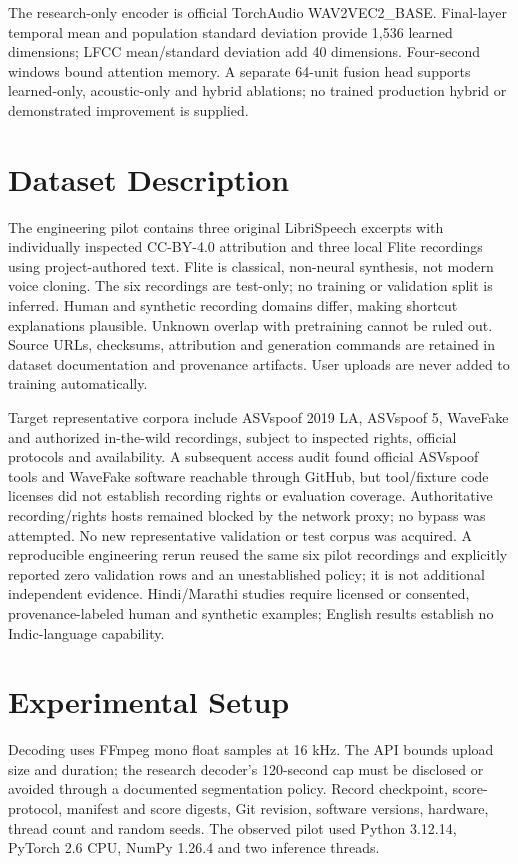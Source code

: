\IfFileExists{IEEEtran.cls}{\documentclass[conference]{IEEEtran}}{\documentclass[10pt,twocolumn]{article}\usepackage[margin=0.75in]{geometry}}
\begin{document}
The research-only encoder is official TorchAudio WAV2VEC2\_BASE. Final-layer temporal mean and population standard deviation provide 1,536 learned dimensions; LFCC mean/standard deviation add 40 dimensions. Four-second windows bound attention memory. A separate 64-unit fusion head supports learned-only, acoustic-only and hybrid ablations; no trained production hybrid or demonstrated improvement is supplied.

\section{Dataset Description}
The engineering pilot contains three original LibriSpeech excerpts with individually inspected CC-BY-4.0 attribution and three local Flite recordings using project-authored text. Flite is classical, non-neural synthesis, not modern voice cloning. The six recordings are test-only; no training or validation split is inferred. Human and synthetic recording domains differ, making shortcut explanations plausible. Unknown overlap with pretraining cannot be ruled out. Source URLs, checksums, attribution and generation commands are retained in dataset documentation and provenance artifacts. User uploads are never added to training automatically.

Target representative corpora include ASVspoof 2019 LA, ASVspoof 5, WaveFake and authorized in-the-wild recordings, subject to inspected rights, official protocols and availability. A subsequent access audit found official ASVspoof tools and WaveFake software reachable through GitHub, but tool/fixture code licenses did not establish recording rights or evaluation coverage. Authoritative recording/rights hosts remained blocked by the network proxy; no bypass was attempted. No new representative validation or test corpus was acquired. A reproducible engineering rerun reused the same six pilot recordings and explicitly reported zero validation rows and an unestablished policy; it is not additional independent evidence. Hindi/Marathi studies require licensed or consented, provenance-labeled human and synthetic examples; English results establish no Indic-language capability.

\section{Experimental Setup}
Decoding uses FFmpeg mono float samples at 16 kHz. The API bounds upload size and duration; the research decoder's 120-second cap must be disclosed or avoided through a documented segmentation policy. Record checkpoint, score-protocol, manifest and score digests, Git revision, software versions, hardware, thread count and random seeds. The observed pilot used Python 3.12.14, PyTorch 2.6 CPU, NumPy 1.26.4 and two inference threads.
\end{document}
